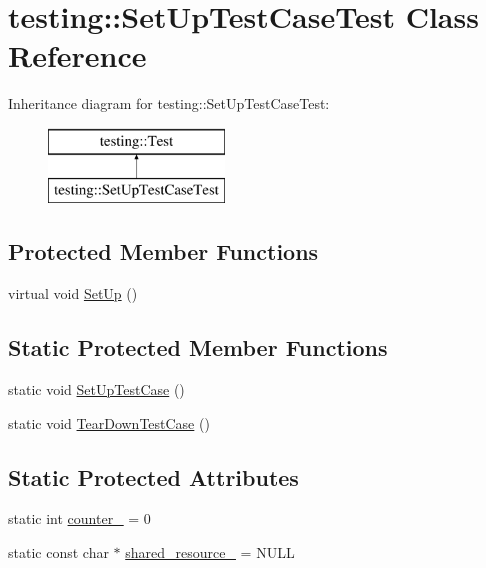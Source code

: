 \hypertarget{classtesting_1_1_set_up_test_case_test}{}\section{testing\+:\+:Set\+Up\+Test\+Case\+Test Class Reference}
\label{classtesting_1_1_set_up_test_case_test}
Inheritance diagram for testing\+:\+:Set\+Up\+Test\+Case\+Test\+:\begin{figure}[H]
\begin{center}
\leavevmode
\includegraphics[height=2.000000cm]{classtesting_1_1_set_up_test_case_test}
\end{center}
\end{figure}
\subsection*{Protected Member Functions}
\begin{DoxyCompactItemize}
\item 
virtual void \hyperlink{classtesting_1_1_set_up_test_case_test_a4b44551ccf73e66de7ec95b2ab3b2085}{Set\+Up} ()
\end{DoxyCompactItemize}
\subsection*{Static Protected Member Functions}
\begin{DoxyCompactItemize}
\item 
static void \hyperlink{classtesting_1_1_set_up_test_case_test_a50732abc0bcb3725e6dfd6a2d487e944}{Set\+Up\+Test\+Case} ()
\item 
static void \hyperlink{classtesting_1_1_set_up_test_case_test_abdc133cd161ff2fa317f489da9bdccf3}{Tear\+Down\+Test\+Case} ()
\end{DoxyCompactItemize}
\subsection*{Static Protected Attributes}
\begin{DoxyCompactItemize}
\item 
static int \hyperlink{classtesting_1_1_set_up_test_case_test_a5b6e811128d35389be49f6569bf93817}{counter\+\_\+} = 0
\item 
static const char $\ast$ \hyperlink{classtesting_1_1_set_up_test_case_test_a904e77fd9a628b6a9aca0280665fd040}{shared\+\_\+resource\+\_\+} = N\+U\+L\+L
\end{DoxyCompactItemize}
